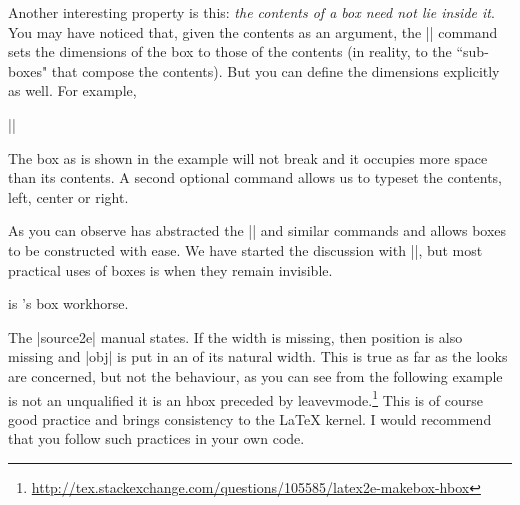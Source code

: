 {Another interesting property is this: \emph{the contents of a box need not lie inside it}. You may have
noticed that, given the contents as an argument, the
|\framebox| command sets the dimensions of the box
to those of the contents (in reality, to the ``sub-boxes"
that compose the contents). But you can define the
dimensions explicitly as well. For example,

\begin{scriptexample}[]{}
||


\end{scriptexample}

The box as is shown in the example will not break and it occupies more space than its contents. A second optional command allows us to typeset the contents, left, center or right.

\begin{codeexample}[vbox]

\par

\par

\par

\par

\par

\par
\end{codeexample}

As you can observe \latexe has abstracted the |\hfill| and similar commands and allows boxes to be constructed with ease. We have started the discussion with |\framebox|, but most practical uses of boxes is when they remain invisible.

\CMDI{\makebox} is \latex's box workhorse.

The |source2e| manual states. If the width is missing, then position is also missing and |obj|  is put in an  of its natural width. This is true as far as the looks are concerned, but not the behaviour, as you can see
from the following example is not an unqualified \cmd{\hbox} it is an hbox preceded by leavevmode.\footnote{\url{http://tex.stackexchange.com/questions/105585/latex2e-makebox-hbox}} This is of course good practice and brings consistency to the LaTeX kernel. I would recommend that you follow such practices in your own code. 

}
